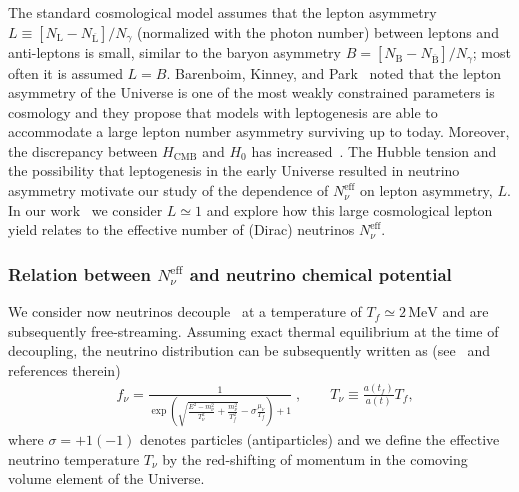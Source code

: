 The standard cosmological model assumes that the lepton asymmetry $L\equiv  [N_\mathrm{L}-N_{\overline{\mathrm{L}}}] /N_\gamma $  (normalized with the photon number) 
between leptons and anti-leptons is small, similar to the baryon asymmetry $B=[N_\mathrm{B}-N_{\overline{\mathrm{B}}}]/N_\gamma $; most often it is assumed $L=B$. Barenboim, Kinney, and Park~\cite{Barenboim:2016shh,Barenboim:2017dfq} noted that the lepton asymmetry of the Universe is one of the most weakly constrained parameters is cosmology and they propose that models with leptogenesis are able to accommodate a large lepton number asymmetry surviving up to today.  Moreover, the discrepancy between $H_\mathrm{CMB}$ and $H_0$ has increased~\cite{riess2018new,Riess:2018byc,Planck:2018vyg}. The Hubble tension and the possibility that leptogenesis in the early Universe resulted in neutrino asymmetry motivate our study of the dependence of $N_\nu^{\mathrm{eff}}$ on lepton asymmetry, $L$. In our work~\cite{Yang:2018oqg} we consider $L\simeq 1$ and explore how this large cosmological lepton yield relates to the effective number of (Dirac) neutrinos $N^{\mathrm{eff}}_\nu$. 

\subsubsection{Relation between $N_\nu^{\mathrm{eff}}$ and neutrino chemical potential}
We consider now neutrinos decouple~\cite{Birrell:2014gea} at a temperature of $T_f\simeq 2\,\mathrm{MeV}$ and are subsequently free-streaming. Assuming exact thermal equilibrium at the time of decoupling, the neutrino distribution can be subsequently written as (see~\cite{Birrell:2012gg} and references therein)
\begin{align}
\label{fnudef}
&f_\nu=\frac{1}{\exp{\left(\sqrt{\frac{E^2-m_\nu^2}{T_\nu^2}+\frac{m^2_\nu}{T^2_f}}-\sigma\frac{\mu_\nu}{T_f}\right)+1}}\;,\qquad T_\nu\equiv\frac{a(t_f)}{a(t)}T_f,
\end{align}
where $\sigma=+1(-1)$ denotes particles (antiparticles) and we define the effective neutrino temperature $T_\nu$  by the red-shifting of momentum in the comoving volume element of the Universe.

